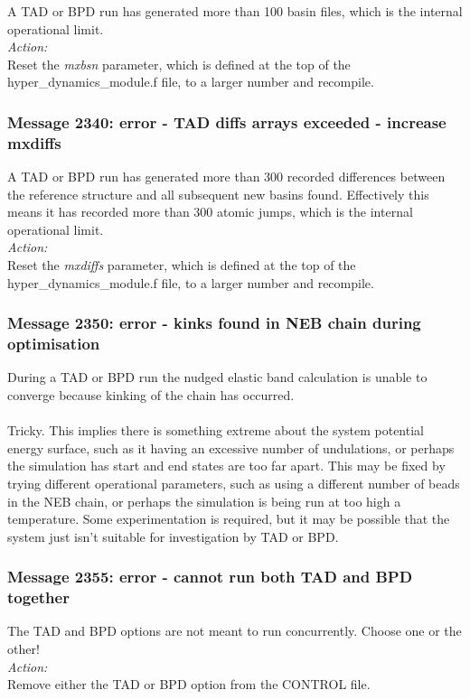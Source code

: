 A TAD or BPD run has generated more than 100 basin files, which is the
internal operational limit.\\

\noindent
{\em Action:}\\ Reset the {\em mxbsn} parameter, which is defined at
the top of the hyper\_dynamics\_module.f file, to a larger number and
recompile.

\subsubsection*{Message 2340: error - TAD diffs arrays exceeded -
increase mxdiffs}

A TAD or BPD run has generated more than 300 recorded differences
between the reference structure and all subsequent new basins
found. Effectively this means it has recorded more than 300 atomic
jumps, which is the internal operational limit.\\

\noindent
{\em Action:}\\ Reset the {\em mxdiffs} parameter, which is defined at
the top of the hyper\_dynamics\_module.f file, to a larger number and
recompile.

\subsubsection*{Message 2350: error - kinks found in NEB chain 
during optimisation}

During a TAD or BPD run the nudged elastic band calculation is unable to
converge because kinking of the chain has occurred. \\

\\ Tricky. This implies there is something extreme
about the system potential energy surface, such as it having an excessive
number of undulations, or perhaps the simulation has start and end states are
too far apart. This may be fixed by trying different operational parameters,
such as using a different number of beads in the NEB chain, or perhaps the
simulation is being run at too high a temperature. Some experimentation is
required, but it may be possible that the system just isn't suitable for
investigation by TAD or BPD.

\subsubsection*{Message 2355: error - cannot run both TAD and BPD together}

The TAD and BPD options are not meant to run concurrently. Choose one or the
other! \\

\noindent
{\em Action:}\\ Remove either the TAD or BPD option from the CONTROL file.


